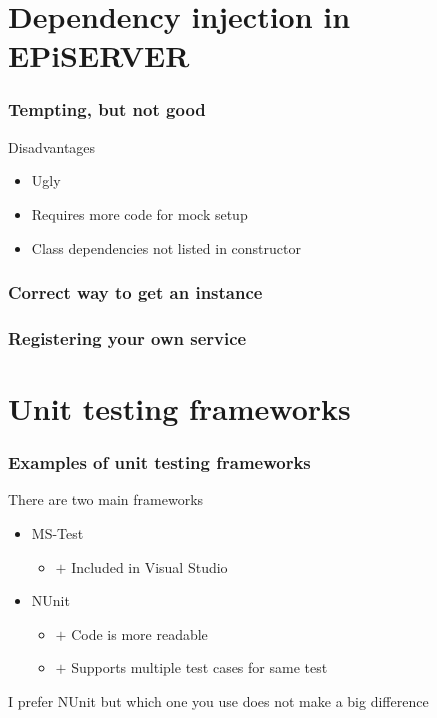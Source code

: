 \documentclass{beamer}
\begin{document}
	\section{Dependency injection in EPiSERVER}
		\begin{frame}
			\frametitle{Tempting, but not good}
			 \pause
			\begin{exampleblock}{Disadvantages} \pause
				\begin{itemize}
					\item Ugly \pause
					\item Requires more code for mock setup \pause
					\item Class dependencies not listed in constructor
				\end{itemize}
			\end{exampleblock}
		\end{frame}
		\begin{frame}
			\frametitle{Correct way to get an instance}
			
		\end{frame}
		\begin{frame}
			\frametitle{Registering your own service}
			
		\end{frame}

	\section{Unit testing frameworks}
	\begin{frame}
			\frametitle{Examples of unit testing frameworks} \pause
			\begin{exampleblock}{There are two main frameworks} \pause
			\begin{itemize}
				\item MS-Test \pause
				\begin{itemize}
					\item $+$ Included in Visual Studio \pause
				\end{itemize}
				\item NUnit \pause
				\begin{itemize}
					\item $+$ Code is more readable \pause
					\item $+$ Supports multiple test cases for same test \pause
				\end{itemize}
			\end{itemize}
			\end{exampleblock}

			\begin{exampleblock}{I prefer NUnit but which one you use does not make a big difference}
			\end{exampleblock}
		\end{frame}
\end{document}
